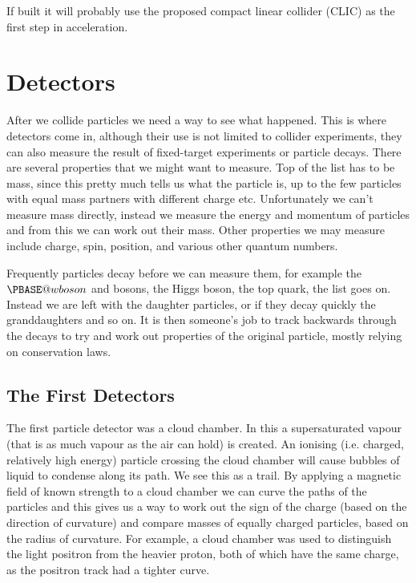 \documentclass[fleqn]{NotesClass}
\makeatletter
\newcommand{\Pwboson}{\ensuremath{\PBASE@wboson}}
\newcommand{\PW}{\Pwboson}
\makeatother
\begin{document}
    If built it will probably use the proposed compact linear collider (CLIC) as the first step in acceleration.
    
    \chapter{Detectors}
    After we collide particles we need a way to see what happened.
    This is where detectors come in, although their use is not limited to collider experiments, they can also measure the result of fixed-target experiments or particle decays.
    There are several properties that we might want to measure.
    Top of the list has to be mass, since this pretty much tells us what the particle is, up to the few particles with equal mass partners with different charge etc.
    Unfortunately we can't measure mass directly, instead we measure the energy and momentum of particles and from this we can work out their mass.
    Other properties we may measure include charge, spin, position, and various other quantum numbers.
    
    Frequently particles decay before we can measure them, for example the \PW{} and \PZ{} bosons, the Higgs boson, the top quark, the list goes on.
    Instead we are left with the daughter particles, or if they decay quickly the granddaughters and so on.
    It is then someone's job to track backwards through the decays to try and work out properties of the original particle, mostly relying on conservation laws.
    
    \section{The First Detectors}
    The first particle detector was a cloud chamber.
    In this a supersaturated vapour (that is as much vapour as the air can hold) is created.
    An ionising (i.e. charged, relatively high energy)  particle crossing the cloud chamber will cause bubbles of liquid to condense along its path.
    We see this as a trail.
    By applying a magnetic field of known strength to a cloud chamber we can curve the paths of the particles and this gives us a way to work out the sign of the charge (based on the direction of curvature) and compare masses of equally charged particles, based on the radius of curvature.
    For example, a cloud chamber was used to distinguish the light positron from the heavier proton, both of which have the same charge, as the positron track had a tighter curve.
    
\end{document}
